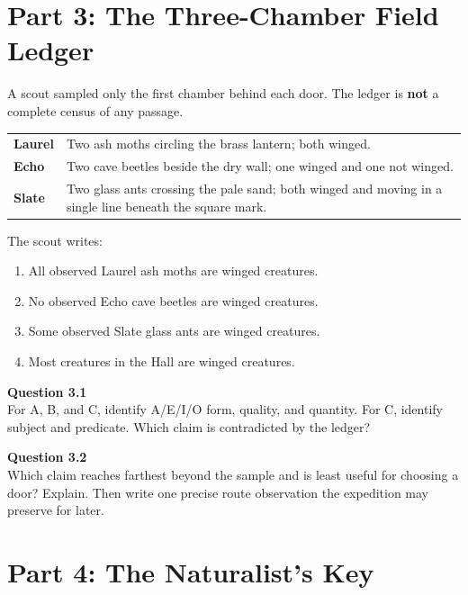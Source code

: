 \documentclass[12pt]{article}
\newcommand{\cluebox}[1]{%
\par\vspace{0.12em}\noindent\begin{minipage}{\textwidth}\itshape #1\end{minipage}\par\vspace{0.12em}}
\begin{document}
\newpage

\section*{Part 3: The Three-Chamber Field Ledger}

A scout sampled only the first chamber behind each door. The ledger is \textbf{not} a complete census of any passage.

\cluebox{
\begin{tabular}{>{\bfseries}p{}p{0.74\textwidth}}
Laurel & Two ash moths circling the brass lantern; both winged.\\
Echo & Two cave beetles beside the dry wall; one winged and one not winged.\\
Slate & Two glass ants crossing the pale sand; both winged and moving in a single line beneath the square mark.\\
\end{tabular}}

The scout writes:

\begin{enumerate}[label=\Alph*.,leftmargin=2em,itemsep=0.1em]
\item All observed Laurel ash moths are winged creatures.
\item No observed Echo cave beetles are winged creatures.
\item Some observed Slate glass ants are winged creatures.
\item Most creatures in the Hall are winged creatures.
\end{enumerate}

\textbf{Question 3.1}\\[-0.15em]
For A, B, and C, identify A/E/I/O form, quality, and quantity. For C, identify subject and predicate. Which claim is contradicted by the ledger?


\newpage

\textbf{Question 3.2}\\[-0.15em]
Which claim reaches farthest beyond the sample and is least useful for choosing a door? Explain. Then write one precise route observation the expedition may preserve for later.


\newpage

\section*{Part 4: The Naturalist's Key}
\end{document}
